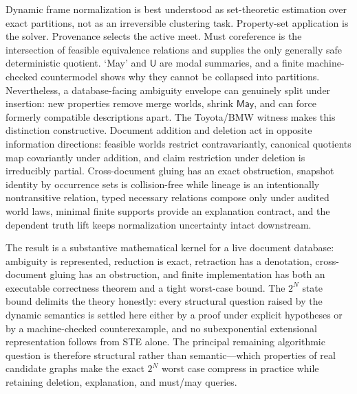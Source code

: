 \documentclass[11pt]{article}
\theoremstyle{definition}
\theoremstyle{remark}
\newcommand{\May}{\mathsf{May}}
\newcommand{\Uncertain}{\mathsf U}
\begin{document}
Dynamic frame normalization is best understood as set-theoretic estimation
over exact partitions, not as an irreversible clustering task.  Property-set
application is the solver.  Provenance selects the active meet.  Must
coreference is the intersection of feasible equivalence relations and supplies
the only generally safe deterministic quotient.  `May' and $\Uncertain$ are
modal summaries, and a finite machine-checked countermodel shows why they
cannot be collapsed into partitions.  Nevertheless, a database-facing
ambiguity envelope can genuinely split under insertion: new properties remove
merge worlds, shrink $\May$, and can force formerly compatible descriptions
apart.  The Toyota/BMW witness makes this distinction constructive.  Document
addition and deletion act in opposite information directions: feasible worlds
restrict contravariantly, canonical quotients map covariantly under addition,
and claim restriction under deletion is irreducibly partial.  Cross-document
gluing has an exact obstruction, snapshot identity by occurrence sets is
collision-free while lineage is an intentionally nontransitive relation, typed
necessary relations compose only under audited world laws, minimal finite
supports provide an explanation contract, and the dependent truth lift keeps
normalization uncertainty intact downstream.

The result is a substantive mathematical kernel for a live document database:
ambiguity is represented, reduction is exact, retraction has a denotation,
cross-document gluing has an obstruction, and finite implementation has both
an executable correctness theorem and a tight worst-case bound.  The $2^N$
state bound delimits the theory honestly: every structural question raised by
the dynamic semantics is settled here either by a proof under explicit
hypotheses or by a machine-checked counterexample, and no subexponential
extensional representation follows from STE alone.  The principal remaining
algorithmic question is therefore structural rather than semantic---which
properties of real candidate graphs make the exact $2^N$ worst case compress
in practice while retaining deletion, explanation, and must/may queries.



\end{document}
